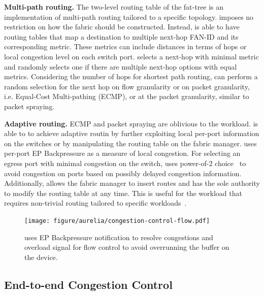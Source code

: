 \noindent \textbf{Multi-path routing.}
%
The two-level routing table of the fat-tree is an implementation of multi-path routing tailored to a specific topology. 
%
\aurelia imposes no restriction on how the fabric should be constructed. 
%
Instead, \aurelia is able to have routing tables that map a destination to multiple next-hop FAN-ID and its corresponding metric. 
%
These metrics can include distances in terms of hops or local congestion level on each switch port. 
%
\aurelia selects a next-hop with minimal metric and randomly selects one if there are multiple next-hop options with equal metrics.  
%
Considering the number of hops for shortest path routing, \aurelia can perform a random selection for the next hop on flow granularity or on packet granularity, i.e. Equal-Cost Multi-pathing (ECMP), or at the packet granularity, similar to packet spraying.

\noindent \textbf{Adaptive routing.}
%
ECMP and packet spraying are oblivious to the workload. 
%
\aurelia is able to to achieve adaptive routin by further exploiting local per-port information on the switches or by manipulating the routing table on the fabric manager.
%
\aurelia uses per-port EP Backpressure as a measure of local congestion. 
%
For selecting an egress port with minimal congestion on the switch, \aurelia uses power-of-2 choice~\cite{power-of-two:tpds:2001} to avoid congestion on ports based on possibly delayed congestion information.
%
Additionally, \aurelia allows the fabric manager to insert routes and has the sole authority to modify the routing table at any time.
%
This is useful for the workload that requires non-trivial routing tailored to specific workloads~\cite{gullfoss:tech-report:2015, fractos:eurosys:2022}. 

\begin{figure}[ht!]
    \centering
    \texttt{[image: figure/aurelia/congestion-control-flow.pdf]}
    \caption{\aurelia uses EP Backpressure notification to resolve congestions and overload signal for flow control to avoid overrunning the buffer on the device.}
    \label{fig:congestion-control}
\end{figure}

\subsection{End-to-end Congestion Control}
\label{aurelia:sec:design:congestion-control}

